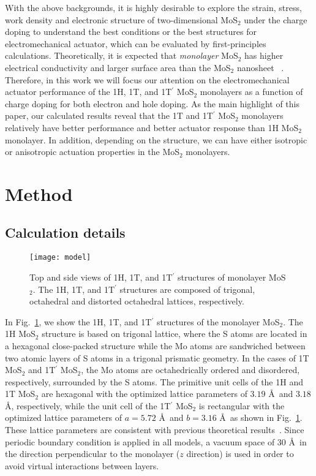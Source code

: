 \documentclass[12pt]{iopart}
\begin{document}
With the above backgrounds, it is highly desirable to explore the
strain, stress, work density and electronic structure of two-dimensional MoS$_2$ under
the charge doping to understand the best conditions or the best
structures for electromechanical actuator, which can be evaluated by
first-principles calculations.  Theoretically, it is expected that
\emph{monolayer} MoS$_2$ has higher electrical conductivity and larger
surface area than the MoS$_2$ nanosheet ~\cite{li2012ideal,bertolazzi2011stretching,castellanos2012elastic}.
Therefore, in this work we will focus our attention on the
electromechanical actuator performance of the 1H, 1T, and 1T$^\prime$
MoS$_2$ monolayers as a function of charge doping for both electron
and hole doping.  As the main highlight of this paper, our calculated
results reveal that the 1T and 1T$^\prime$ MoS$_2$ monolayers
relatively have better performance and better actuator response than
1H MoS$_2$ monolayer.  In addition, depending on the structure, we can
have either isotropic or anisotropic actuation properties in the
MoS$_2$ monolayers.

\section{Method}
\subsection{Calculation details}

\begin{figure}[t!]
  \centering \texttt{[image: model]}
  \caption{\label{fig:model} Top and side views of 1H, 1T, and
    1T$^\prime$ structures of monolayer MoS$_2$.  The 1H, 1T, and
    1T$^\prime$ structures are composed of trigonal, octahedral and
    distorted octahedral lattices, respectively.}
\end{figure}

In Fig.~\ref{fig:model}, we show the 1H, 1T, and 1T$^\prime$
structures of the monolayer MoS$_2$.  The 1H MoS$_2$ structure is
based on trigonal lattice, where the S atoms are located in a
hexagonal close-packed structure while the Mo atoms are sandwiched
between two atomic layers of S atoms in a trigonal prismatic geometry.
In the cases of 1T MoS$_2$ and 1T$^\prime$ MoS$_2$, the Mo atoms are
octahedrically ordered and disordered, respectively, surrounded by the
S atoms.  The primitive unit cells of the 1H and 1T MoS$_2$ are
hexagonal with the optimized lattice parameters of $3.19$ \AA\ and
$3.18$ \AA, respectively, while the unit cell of the 1T$^\prime$
MoS$_2$ is rectangular with the optimized lattice parameters of
$a=5.72$ \AA\ and $b=3.16$ \AA\ as shown in
Fig.~\ref{fig:model}. These lattice parameters are consistent with
previous theoretical results~\cite{sun2016origin,fan2014site}. Since
periodic boundary condition is applied in all models, a vacuum space
of 30 \AA\ in the direction perpendicular to the monolayer ($z$
direction) is used in order to avoid virtual interactions between
layers.
\end{document}
